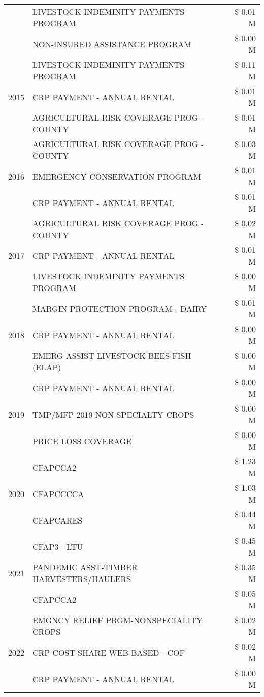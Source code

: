 \begin{tabular}{llr}
 & LIVESTOCK INDEMINITY PAYMENTS PROGRAM & \$ 0.01 M \\
 & NON-INSURED ASSISTANCE PROGRAM & \$ 0.00 M \\
\cline{1-3}
\multirow[t]{3}{*}{2015} & LIVESTOCK INDEMINITY PAYMENTS PROGRAM & \$ 0.11 M \\
 & CRP PAYMENT - ANNUAL RENTAL & \$ 0.01 M \\
 & AGRICULTURAL RISK COVERAGE PROG - COUNTY & \$ 0.01 M \\
\cline{1-3}
\multirow[t]{3}{*}{2016} & AGRICULTURAL RISK COVERAGE PROG - COUNTY & \$ 0.03 M \\
 & EMERGENCY CONSERVATION PROGRAM & \$ 0.01 M \\
 & CRP PAYMENT - ANNUAL RENTAL & \$ 0.01 M \\
\cline{1-3}
\multirow[t]{3}{*}{2017} & AGRICULTURAL RISK COVERAGE PROG - COUNTY & \$ 0.02 M \\
 & CRP PAYMENT - ANNUAL RENTAL & \$ 0.01 M \\
 & LIVESTOCK INDEMINITY PAYMENTS PROGRAM & \$ 0.00 M \\
\cline{1-3}
\multirow[t]{3}{*}{2018} & MARGIN PROTECTION PROGRAM - DAIRY & \$ 0.01 M \\
 & CRP PAYMENT - ANNUAL RENTAL & \$ 0.00 M \\
 & EMERG ASSIST LIVESTOCK BEES FISH (ELAP) & \$ 0.00 M \\
\cline{1-3}
\multirow[t]{3}{*}{2019} & CRP PAYMENT - ANNUAL RENTAL & \$ 0.00 M \\
 & TMP/MFP 2019 NON SPECIALTY CROPS & \$ 0.00 M \\
 & PRICE LOSS COVERAGE & \$ 0.00 M \\
\cline{1-3}
\multirow[t]{3}{*}{2020} & CFAPCCA2 & \$ 1.23 M \\
 & CFAPCCCCA & \$ 1.03 M \\
 & CFAPCARES & \$ 0.44 M \\
\cline{1-3}
\multirow[t]{3}{*}{2021} & CFAP3 - LTU & \$ 0.45 M \\
 & PANDEMIC ASST-TIMBER HARVESTERS/HAULERS & \$ 0.35 M \\
 & CFAPCCA2 & \$ 0.05 M \\
\cline{1-3}
\multirow[t]{3}{*}{2022} & EMGNCY RELIEF PRGM-NONSPECIALITY CROPS & \$ 0.02 M \\
 & CRP COST-SHARE WEB-BASED - COF & \$ 0.02 M \\
 & CRP PAYMENT - ANNUAL RENTAL & \$ 0.00 M \\
\cline{1-3}
\bottomrule
\end{tabular}
